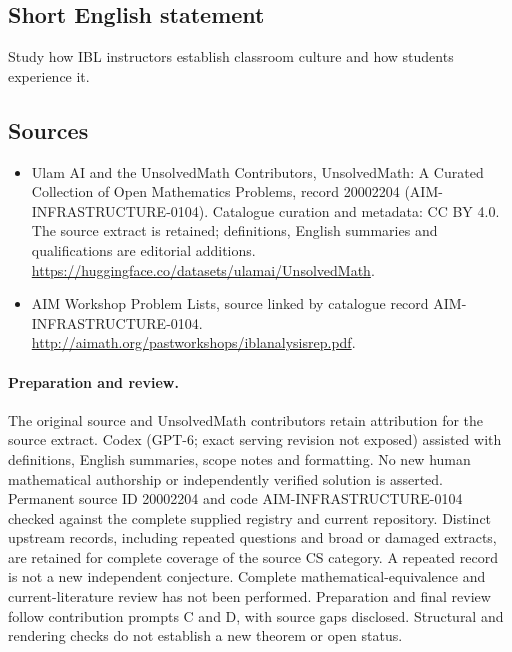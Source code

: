 \documentclass[11pt]{article}
\begin{document}
\subsection{Short English statement}
Study how IBL instructors establish classroom culture and how students experience it.
\subsection{Sources}
\begin{itemize}
\item[\hypertarget{source:20002204:1}{S1}] Ulam AI and the UnsolvedMath Contributors, UnsolvedMath: A Curated Collection of Open Mathematics Problems, record 20002204 (AIM-INFRASTRUCTURE-0104). Catalogue curation and metadata: CC BY 4.0. The source extract is retained; definitions, English summaries and qualifications are editorial additions.
\url{https://huggingface.co/datasets/ulamai/UnsolvedMath}.
\item[\hypertarget{source:20002204:2}{S2}] AIM Workshop Problem Lists, source linked by catalogue record AIM-INFRASTRUCTURE-0104.
\url{http://aimath.org/pastworkshops/iblanalysisrep.pdf}.
\end{itemize}
\paragraph{Preparation and review.}
The original source and UnsolvedMath contributors retain attribution for the source extract. Codex (GPT-6; exact serving revision not exposed) assisted with definitions, English summaries, scope notes and formatting. No new human mathematical authorship or independently verified solution is asserted. Permanent source ID 20002204 and code AIM-INFRASTRUCTURE-0104 checked against the complete supplied registry and current repository. Distinct upstream records, including repeated questions and broad or damaged extracts, are retained for complete coverage of the source CS category. A repeated record is not a new independent conjecture. Complete mathematical-equivalence and current-literature review has not been performed. Preparation and final review follow contribution prompts C and D, with source gaps disclosed. Structural and rendering checks do not establish a new theorem or open status.
\label{end:20002204}
\end{document}
